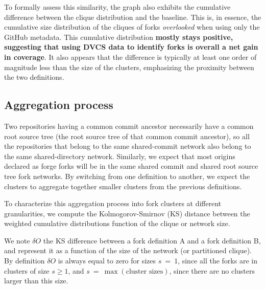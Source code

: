 To formally assess this similarity, the graph also exhibits the cumulative
difference between the clique distribution and the baseline. This is, in
essence, the cumulative size distribution of the cliques of forks
\emph{overlooked} when using only the GitHub metadata.
This cumulative
distribution \textbf{mostly stays positive, suggesting that using \gls{DVCS}
data to identify forks is overall a net gain in coverage}.
It also appears that the
difference is typically at least one order of magnitude less than the size of
the clusters, emphasizing the proximity between the two definitions.

\subsection{Aggregation process}%
\label{sec:forks-aggregation-process}

Two repositories having a common commit ancestor necessarily have a common root
source tree (the root source tree of that common commit ancestor), so all the
repositories that belong to the same shared-commit network also belong to
the same shared-directory network.
Similarly, we expect that most origins declared as forge forks will be
in the same shared commit and shared root source tree fork networks.
By switching from one definition to another, we expect the clusters to
aggregate together smaller clusters from the previous definitions.

To characterize this aggregation process into fork clusters at different
granularities, we compute the Kolmogorov-Smirnov (KS) distance between the
weighted cumulative distributions function of the clique or network size.

We note $\delta O$ the KS difference between a fork
definition A and a fork definition B, and
represent it as a function of the size of the network (or partitioned clique).
By definition $\delta O$ is always equal to zero for sizes $s~=~1$, since all
the forks are in clusters of size $s \geq 1$, and $s~=~\max(\text{cluster
sizes})$, since there are no clusters larger than this size.

